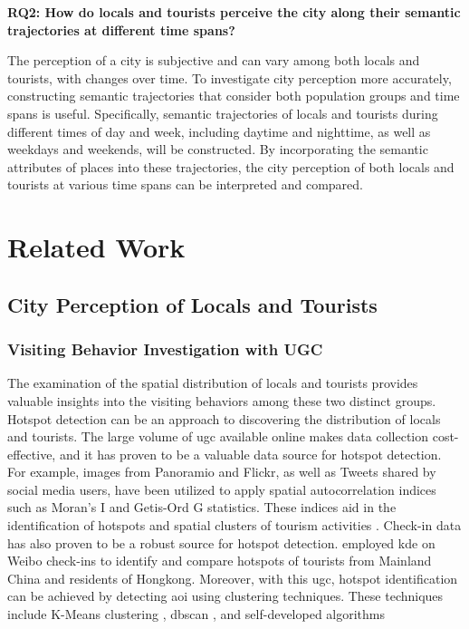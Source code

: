 \documentclass{article}
\theoremstyle{remark}
\begin{document}
\textbf{RQ2: How do locals and tourists perceive the city along their semantic trajectories at different time spans?}

The perception of a city is subjective and can vary among both locals and tourists, with changes over time. To investigate city perception more accurately, constructing semantic trajectories that consider both population groups and time spans is useful. Specifically, semantic trajectories of locals and tourists during different times of day and week, including daytime and nighttime, as well as weekdays and weekends, will be constructed. By incorporating the semantic attributes of places into these trajectories, the city perception of both locals and tourists at various time spans can be interpreted and compared.

\clearpage

\section{Related Work}

\subsection{City Perception of Locals and Tourists}

\subsubsection{Visiting Behavior Investigation with UGC}
The examination of the spatial distribution of locals and tourists provides valuable insights into the visiting behaviors among these two distinct groups. Hotspot detection can be an approach to discovering the distribution of locals and tourists. The large volume of \acrshort{ugc} available online makes data collection cost-effective, and it has proven to be a valuable data source for hotspot detection. For example, images from Panoramio and Flickr, as well as Tweets shared by social media users, have been utilized to apply spatial autocorrelation indices such as Moran's I and Getis-Ord G statistics. These indices aid in the identification of hotspots and spatial clusters of tourism activities \citep{garcia-palomares_identification_2015,kim_coastal_2021}. Check-in data has also proven to be a robust source for hotspot detection. \cite{su_analysing_2020} employed \acrfull{kde} on Weibo check-ins to identify and compare hotspots of tourists from Mainland China and residents of Hongkong. Moreover, with this \acrshort{ugc}, hotspot identification can be achieved by detecting \acrfull{aoi} using clustering techniques. These techniques include K-Means clustering \citep{hartigan_algorithm_1979}, \acrfull{dbscan} \citep{ester_density-based_1996}, and self-developed algorithms \citep{hu_extracting_2015,hasnat_identifying_2018}
\end{document}
